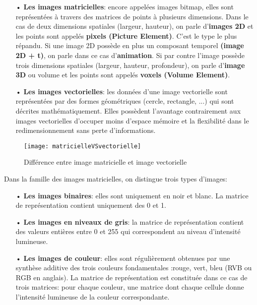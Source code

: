     \begin{itemize}
        \item[•]\textbf{Les images matricielles}: encore appelées images bitmap, elles sont représentées à travers des matrices de points à plusieurs dimensions. Dans le cas de deux dimensions spatiales (largeur, hauteur), on parle d’\textbf{images 2D} et les points sont appelés \textbf{pixels (Picture Element)}. C’est le type le plus répandu. Si une image 2D possède en plus un composant temporel \textbf{(image 2D + t)}, on parle dans ce cas d’\textbf{animation}. Si par contre l’image possède trois dimensions spatiales (largeur, hauteur, profondeur), on parle d’\textbf{image 3D} ou volume et les points sont appelés \textbf{voxels (Volume Element)}.
        \item[•]\textbf{Les images vectorielles}: les données d'une image vectorielle sont représentées par des formes géométriques (cercle, rectangle, ...) qui sont décrites mathématiquement. Elles possèdent l’avantage contrairement aux images vectorielles d’occuper moins d’espace mémoire et la flexibilité dans le redimensionnement sans perte d’informations.
    \end{itemize}
    \begin{figure}
        \centering
        \texttt{[image: matricielleVSvectorielle]}
        \caption{Différence entre image matricielle et image vectorielle}
    \end{figure}
    Dans la famille des images matricielles, on distingue trois types d’images:
    \begin{itemize}
        \item[•]\textbf{Les images binaires}: elles sont uniquement en noir et blanc. La matrice de représentation contient uniquement des 0 et 1.
        \item[•]\textbf{Les images en niveaux de gris}: la matrice de représentation contient des valeurs entières entre 0 et 255 qui correspondent au niveau d’intensité lumineuse.
        \item[•]\textbf{Les images de couleur}: elles sont régulièrement obtenues par une synthèse additive des trois couleurs fondamentales :rouge, vert, bleu (RVB ou RGB en anglais). La matrice de représentation est constituée dans ce cas de trois matrices: pour chaque couleur, une matrice dont chaque cellule donne l’intensité lumineuse de la couleur correspondante.
    \end{itemize}
